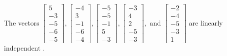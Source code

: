 \begin{exercise}
\begin{exerciseStatement}
  \end{exerciseStatement}
  \begin{exerciseAnswer}
   The vectors \(\left[\begin{array}{r}
5 \\
-3 \\
-5 \\
-6 \\
-5
\end{array}\right] , \left[\begin{array}{r}
-4 \\
3 \\
-1 \\
-6 \\
-4
\end{array}\right] , \left[\begin{array}{r}
-5 \\
-5 \\
-1 \\
5 \\
-3
\end{array}\right] , \left[\begin{array}{r}
-3 \\
4 \\
2 \\
-5 \\
-3
\end{array}\right] , \text{ and } \left[\begin{array}{r}
-2 \\
-4 \\
-5 \\
-3 \\
1
\end{array}\right]\) are 
  	 linearly independent  .
  


  \end{exerciseAnswer}
\end{exercise}